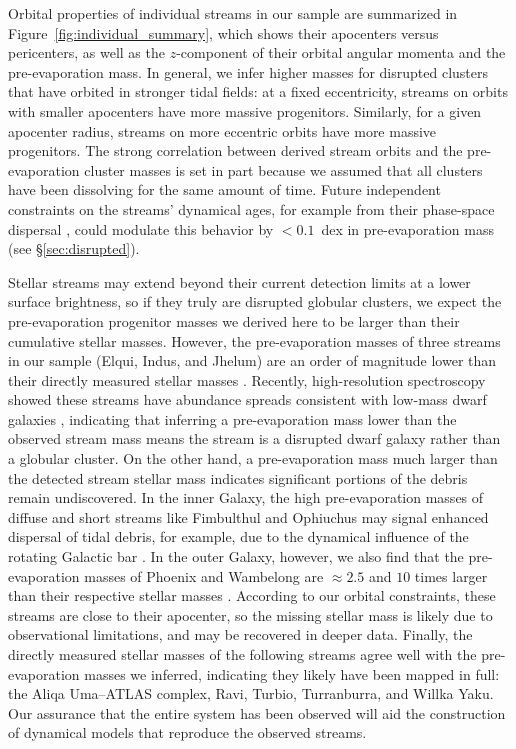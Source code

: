\documentclass[twocolumn]{aastex63}
\begin{document}
Orbital properties of individual streams in our sample are summarized in Figure~\ref{fig:individual_summary}, which shows their apocenters versus pericenters, as well as the $z$-component of their orbital angular momenta and the pre-evaporation mass.
In general, we infer higher masses for disrupted clusters that have orbited in stronger tidal fields: at a fixed eccentricity, streams on orbits with smaller apocenters have more massive progenitors.
Similarly, for a given apocenter radius, streams on more eccentric orbits have more massive progenitors.
The strong correlation between derived stream orbits and the pre-evaporation cluster masses is set in part because we assumed that all clusters have been dissolving for the same amount of time.
Future independent constraints on the streams' dynamical ages, for example from their phase-space dispersal \citep{buckley:2019}, could modulate this behavior by $<0.1$~dex in pre-evaporation mass (see \S\ref{sec:disrupted}).

Stellar streams may extend beyond their current detection limits at a lower surface brightness, so if they truly are disrupted globular clusters, we expect the pre-evaporation progenitor masses we derived here to be larger than their cumulative stellar masses.
However, the pre-evaporation masses of three streams in our sample (Elqui, Indus, and Jhelum) are an order of magnitude lower than their directly measured stellar masses \citep{shipp:2018}.
Recently, high-resolution spectroscopy showed these streams have abundance spreads consistent with low-mass dwarf galaxies \citep{ji:2020}, indicating that inferring a pre-evaporation mass lower than the observed stream mass means the stream is a disrupted dwarf galaxy rather than a globular cluster.
On the other hand, a pre-evaporation mass much larger than the detected stream stellar mass indicates significant portions of the debris remain undiscovered.
In the inner Galaxy, the high pre-evaporation masses of diffuse and short streams like Fimbulthul and Ophiuchus may signal enhanced dispersal of tidal debris, for example, due to the dynamical influence of the rotating Galactic bar \citep{hattori:2016, price-whelan:2016}.
In the outer Galaxy, however, we also find that the pre-evaporation masses of Phoenix and Wambelong are $\approx2.5$ and $10$ times larger than their respective stellar masses \citep{shipp:2018}.
According to our orbital constraints, these streams are close to their apocenter, so the missing stellar mass is likely due to observational limitations, and may be recovered in deeper data.
Finally, the directly measured stellar masses of the following streams agree well with the pre-evaporation masses we inferred, indicating they likely have been mapped in full: the Aliqa Uma--ATLAS complex, Ravi, Turbio, Turranburra, and Willka Yaku.
Our assurance that the entire system has been observed will aid the construction of dynamical models that reproduce the observed streams.
\end{document}

